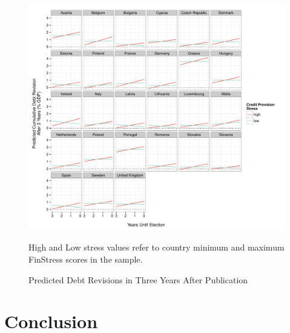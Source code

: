 \documentclass[]{article}
\begin{document}
\begin{figure}
	\caption{Predicted Debt Revisions in Three Years After Publication}
    \label{country_predict_debt_}
    \begin{center}
    	\includegraphics[scale=0.65]{figures/country_predict.pdf}
    \end{center}

	{\scriptsize{High and Low stress values refer to country minimum and maximum FinStress scores in the sample.}}

\end{figure}


\section{Conclusion}


\clearpage



\end{document}
